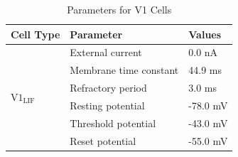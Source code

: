 \documentclass[12pt]{article}
\begin{document}
\begin{table}[H]
  \centering
  \caption{Parameters for V1 Cells}
  \begin{tabular}{lll}
  \toprule
  \textbf{Cell Type} & \textbf{Parameter} & \textbf{Values} \\
  \midrule
  \multirow{8}{*}{$\text{V1}_{\text{LIF}}$} 
      & External current         & 0.0 nA \\
      & Membrane time constant        & 44.9 ms \\
      & Refractory period       & 3.0 ms \\
      & Resting potential          & -78.0 mV \\
      & Threshold potential         & -43.0 mV \\
      & Reset potential      & -55.0 mV \\
  \bottomrule
  \end{tabular}
\end{table}

\end{document}
